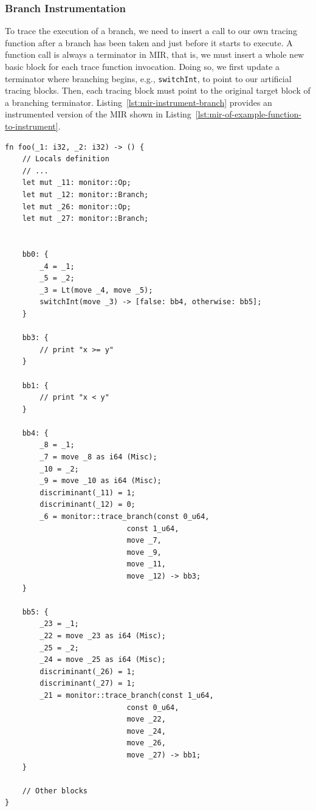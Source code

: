 \documentclass{article}
\begin{document}
\subsubsection{Branch Instrumentation}
To trace the execution of a branch, we need to insert a call to our own tracing function after a branch has been taken and just before it starts to execute. A function call is always a terminator in \ac{MIR}, that is, we must insert a whole new basic block for each trace function invocation. Doing so, we first update a terminator where branching begins, e.g., \lstinline{switchInt}, to point to our artificial tracing blocks. Then, each tracing block must point to the original target block of a branching terminator. Listing~\ref{lst:mir-instrument-branch} provides an instrumented version of the \ac{MIR} shown in Listing~\ref{lst:mir-of-example-function-to-instrument}.
\begin{lstlisting}[language={}, style=boxed, caption={Instrumented branches in the MIR of the \lstinline{foo} function}, label=lst:mir-instrument-branch]
fn foo(_1: i32, _2: i32) -> () {
    // Locals definition
    // ...
    let mut _11: monitor::Op;
    let mut _12: monitor::Branch;
    let mut _26: monitor::Op;
    let mut _27: monitor::Branch;


    bb0: {
        _4 = _1;
        _5 = _2;
        _3 = Lt(move _4, move _5);
        switchInt(move _3) -> [false: bb4, otherwise: bb5];
    }

    bb3: {
        // print "x >= y"
    }

    bb1: {
        // print "x < y"
    }

    bb4: {
        _8 = _1;
        _7 = move _8 as i64 (Misc);
        _10 = _2;
        _9 = move _10 as i64 (Misc);
        discriminant(_11) = 1;
        discriminant(_12) = 0;
        _6 = monitor::trace_branch(const 0_u64,
                            const 1_u64,
                            move _7,
                            move _9,
                            move _11,
                            move _12) -> bb3;
    }

    bb5: {
        _23 = _1;
        _22 = move _23 as i64 (Misc);
        _25 = _2;
        _24 = move _25 as i64 (Misc);
        discriminant(_26) = 1;
        discriminant(_27) = 1;
        _21 = monitor::trace_branch(const 1_u64,
                            const 0_u64,
                            move _22,
                            move _24,
                            move _26,
                            move _27) -> bb1;
    }

    // Other blocks
}
\end{lstlisting}
\end{document}
